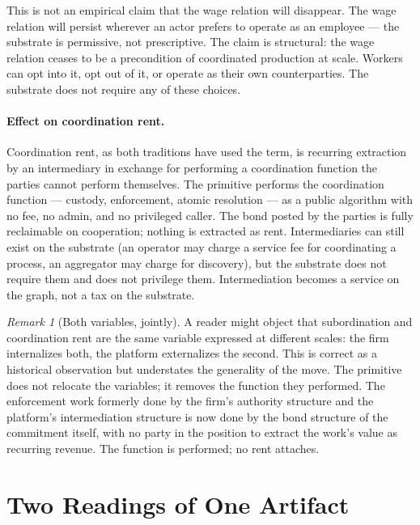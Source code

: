 \documentclass[11pt,a4paper]{article}
\theoremstyle{remark}
\newtheorem{remark}{Remark}[section]
\begin{document}
This is not an empirical claim that the wage relation will
disappear. The wage relation will persist wherever an actor
prefers to operate as an employee --- the substrate is
permissive, not prescriptive. The claim is structural: the wage
relation ceases to be a precondition of coordinated production
at scale. Workers can opt into it, opt out of it, or operate as
their own counterparties. The substrate does not require any of
these choices.

\paragraph{Effect on coordination rent.}
Coordination rent, as both traditions have used the term, is
recurring extraction by an intermediary in exchange for
performing a coordination function the parties cannot perform
themselves. The primitive performs the coordination function ---
custody, enforcement, atomic resolution --- as a public algorithm
with no fee, no admin, and no privileged caller. The bond posted
by the parties is fully reclaimable on cooperation; nothing is
extracted as rent. Intermediaries can still exist on the
substrate (an operator may charge a service fee for coordinating
a process, an aggregator may charge for discovery), but the
substrate does not require them and does not privilege them.
Intermediation becomes a service on the graph, not a tax on the
substrate.

\begin{remark}[Both variables, jointly]
A reader might object that subordination and coordination rent
are the same variable expressed at different scales: the firm
internalizes both, the platform externalizes the second. This is
correct as a historical observation but understates the
generality of the move. The primitive does not relocate the
variables; it removes the function they performed. The
enforcement work formerly done by the firm's authority structure
and the platform's intermediation structure is now done by the
bond structure of the commitment itself, with no party in the
position to extract the work's value as recurring revenue. The
function is performed; no rent attaches.
\end{remark}

\section{Two Readings of One Artifact}
\label{sec:two-readings}
\end{document}
